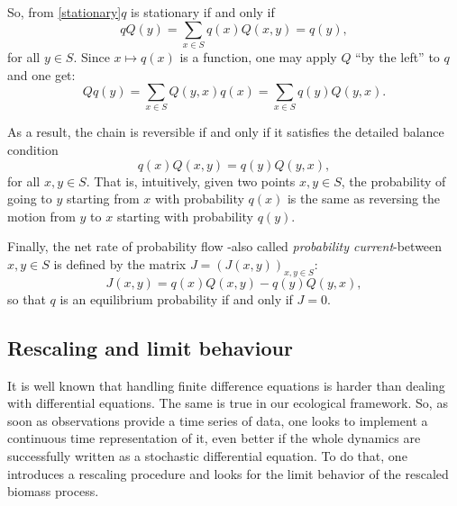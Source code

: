 \documentclass[12pt]{article}
\begin{document}
So, from \eqref{stationary}$q$ is stationary if and only if 
\begin{equation}
    qQ(y)=\sum_{x\in S}q(x)Q(x,y)=q(y),
\end{equation}
for all $y\in S$. Since $x\mapsto q(x)$ is a function, one may apply $Q$ ``by the left'' to $q$ and one get:
\[Qq(y)=\sum_{x\in S}Q(y,x)q (x)=\sum_{x\in S}q(y)Q(y,x).\]

As a result, the chain is reversible if and only if it satisfies the detailed balance condition 
\begin{equation}
    q(x)Q(x,y)=q(y)Q(y,x),
\end{equation}
for all $x,y\in S$.
That is, intuitively, given two points $x,y\in S$, the probability of going to $y$ starting from $x$ with probability $q (x)$ is the same as reversing the motion from $y$ to $x$ starting with probability $q (y)$.

Finally, the net rate of probability flow -also called \textit{probability current}-between $x,y\in S$ is defined by the matrix $J=(J(x,y))_{x,y\in S}$:
\begin{equation}
    J(x,y)=q(x)Q(x,y)-q(y)Q(y,x),
\end{equation}
so that $q$ is an equilibrium probability if and only if $J=0$.
\subsection{Rescaling and limit behaviour}
It is well known that handling finite difference equations is harder than dealing with differential equations. The same is true in our ecological framework. So, as soon as observations provide a time series of data, one looks to implement a continuous time representation of it, even better if the whole dynamics are successfully written as a stochastic differential equation. To do that, one introduces a rescaling procedure and looks for the limit behavior of the rescaled biomass process.
\end{document}
